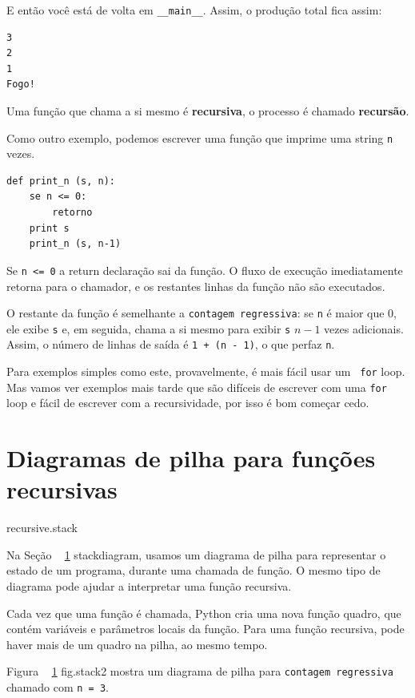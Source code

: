 \documentclass[10pt]{book}
\begin{document}
{E então você está de volta em \verb "__main__". Assim, o
produção total fica assim:

\begin{verbatim}
3
2
1
Fogo!
\end{verbatim}
%
Uma função que chama a si mesmo é {\bf recursiva}, o processo é
chamado {\bf recursão}.

Como outro exemplo, podemos escrever uma função que imprime uma
string {\tt n} vezes.

\begin{verbatim}
def print_n (s, n):
    se n <= 0:
        retorno
    print s
    print_n (s, n-1)
\end{verbatim}
%
Se {\tt n <= 0} a {return \tt} declaração sai da função. O
fluxo de execução imediatamente retorna para o chamador, e os restantes
linhas da função não são executados.

O restante da função é semelhante a {\tt contagem regressiva}: se {\tt n} é
maior que 0, ele exibe {\tt s} e, em seguida, chama a si mesmo para exibir
{\tt s} $ n-1 $ vezes adicionais. Assim, o número de linhas de saída
é {\tt 1 + (n - 1)}, o que perfaz
{\tt n}.

Para exemplos simples como este, provavelmente, é mais fácil usar um {\tt
for} loop. Mas vamos ver exemplos mais tarde que são difíceis de escrever
com uma {\tt for} loop e fácil de escrever com a recursividade, por isso é
bom começar cedo.



\section{Diagramas de pilha para funções recursivas}
\label{} recursive.stack

Na Seção ~ \ref {} stackdiagram, usamos um diagrama de pilha para representar
o estado de um programa, durante uma chamada de função. O mesmo tipo de
diagrama pode ajudar a interpretar uma função recursiva.

Cada vez que uma função é chamada, Python cria uma nova função
quadro, que contém variáveis ​​e parâmetros locais da função.
Para uma função recursiva, pode haver mais de um quadro na
pilha, ao mesmo tempo.

Figura ~ \ref {} fig.stack2 mostra um diagrama de pilha para {\tt contagem regressiva} chamado com
{\tt n = 3}.

}
\end{document}
